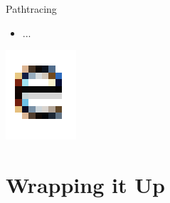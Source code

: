 \documentclass{lug}
\newcommand{\splitslide}[4]{
    \noindent
    \begin{minipage}{#1 \textwidth - #2 }
        #3
    \end{minipage}%
    \hspace{ \dimexpr #2 * 2 \relax }%
    \begin{minipage}{\textwidth - #1 \textwidth - #2 }
        #4
    \end{minipage}
}
\begin{document}
\begin{frame}{Pathtracing}
    \splitslide{0.65}{.7em}{
        \small
        \begin{itemize}
            \item ...
        \end{itemize}
    }{
        \includegraphics[width=\textwidth]{graphics/subpixel_e}
    }
    \noindent
\end{frame}

\section{Wrapping it Up}
\end{document}
